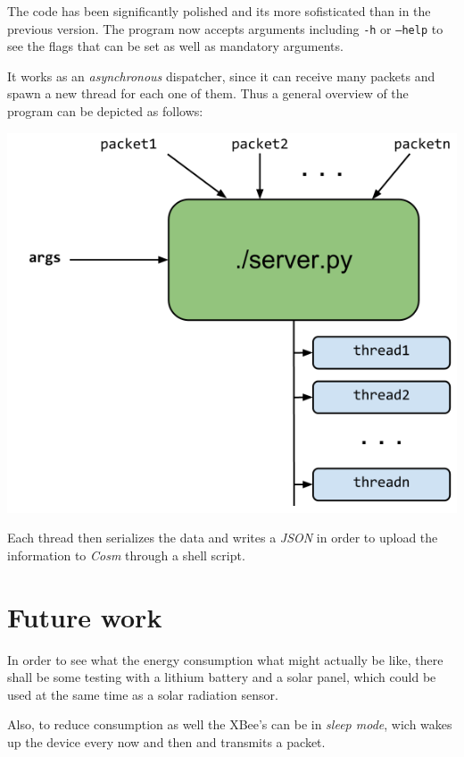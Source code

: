 \documentclass[a4paper,twocolumn]{IEEEtran}
\begin{document}
    The code has been significantly polished and its more sofisticated than in the previous version. The program now accepts arguments including \texttt{-h} or \texttt{--help} to see the flags that can be set as well as mandatory arguments.

    It works as an \emph{asynchronous} dispatcher, since it can receive many packets and spawn a new thread for each one of them. Thus a general overview of the program can be depicted as follows:

    \begin{center}
        \includegraphics[scale=0.35]{server.png}
    \end{center}

    Each thread then serializes the data and writes a \emph{JSON} in order to upload the information to \emph{Cosm} through a shell script.


    \section{Future work}

    In order to see what the energy consumption what might actually be like, there shall be some testing with a lithium battery and a solar panel, which could be used at the same time as a solar radiation sensor.

    Also, to reduce consumption as well the XBee's can be in \emph{sleep mode}, wich wakes up the device every now and then and transmits a packet.
\end{document}
